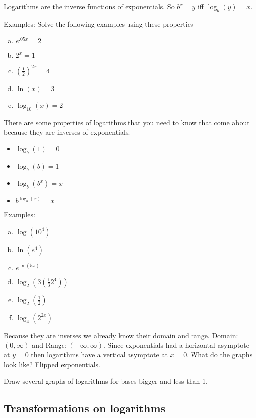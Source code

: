 \documentclass{tufte-handout}
\begin{document}
Logarithms are the inverse functions of exponentials.  So $b^x = y$ iff $\log_{b} (y) = x$. 

Examples: Solve the following examples using these properties

\begin{multicols}{3}
\begin{enumerate}[(a)]
\item $e^{.05x} = 2$
\item $2^{x}= 1$
\item $(\frac{1}{2})^{2x}=4$
\item $\ln(x) = 3$
\item $\log_{10} (x) = 2$
\end{enumerate}
\end{multicols}

There are some properties of logarithms that you need to know that come about because they are inverses of exponentials.
\begin{multicols}{2}
\begin{itemize}
\item $\log_b (1) = 0$
\item $\log_b (b) = 1$
\item $\log_b (b^x) = x$
\item $b^{\log_b(x)}=x$
\end{itemize}
\end{multicols}

Examples:
\begin{multicols}{3}
\begin{enumerate}[(a)]
\item $\log(10^4)$
\item $\ln(e^4)$
\item $e^{\ln(5x)}$
\item $\log_2 (3 (\frac{1}{3} 2^4))$
\item $\log_2( \frac{1}{2})$
\item $\log_4(2^{2x})$
\end{enumerate}
\end{multicols}

Because they are inverses we already know their domain and range.  Domain: $(0,\infty)$ and Range: $(-\infty,\infty)$.  Since exponentials had a horizontal asymptote at $y=0$ then logarithms have a vertical asymptote at $x=0$.  What do the graphs look like?  Flipped exponentials.

Draw several graphs of logarithms for bases bigger and less than 1.

\subsection{Transformations on logarithms}
\end{document}
